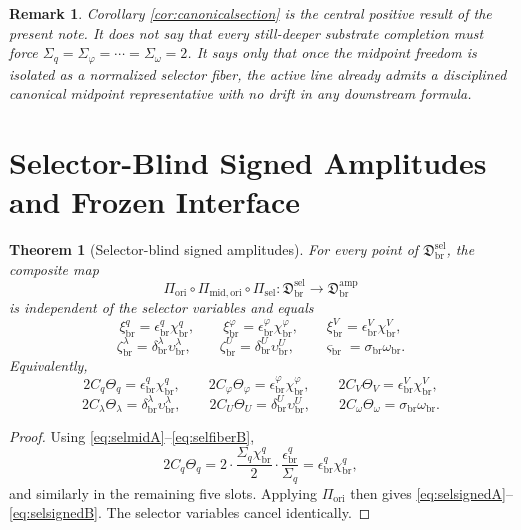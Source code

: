 \documentclass[11pt]{article}
\newcommand{\LiftSector}{\mathfrak D_{\mathrm{br}}^{\mathrm{amp}}}
\newcommand{\DeepReadAmp}{\xi_{\mathrm{br}}^{q}}
\newcommand{\DeepCovAmp}{\xi_{\mathrm{br}}^{\varphi}}
\newcommand{\DeepRelaxAmp}{\xi_{\mathrm{br}}^{V}}
\newcommand{\DeepWellAmp}{\zeta_{\mathrm{br}}^{\lambda}}
\newcommand{\DeepEqAmp}{\zeta_{\mathrm{br}}^{U}}
\newcommand{\DeepScaleAmp}{\varsigma_{\mathrm{br}}}
\newcommand{\AbsReadAmp}{\chi_{\mathrm{br}}^{q}}
\newcommand{\AbsCovAmp}{\chi_{\mathrm{br}}^{\varphi}}
\newcommand{\AbsRelaxAmp}{\chi_{\mathrm{br}}^{V}}
\newcommand{\AbsWellAmp}{\upsilon_{\mathrm{br}}^{\lambda}}
\newcommand{\AbsEqAmp}{\upsilon_{\mathrm{br}}^{U}}
\newcommand{\AbsScaleAmp}{\omega_{\mathrm{br}}}
\newcommand{\PolRead}{\epsilon_{\mathrm{br}}^{q}}
\newcommand{\PolCov}{\epsilon_{\mathrm{br}}^{\varphi}}
\newcommand{\PolRelax}{\epsilon_{\mathrm{br}}^{V}}
\newcommand{\PolWell}{\delta_{\mathrm{br}}^{\lambda}}
\newcommand{\PolEq}{\delta_{\mathrm{br}}^{U}}
\newcommand{\PolScale}{\sigma_{\mathrm{br}}}
\newcommand{\OriginMap}{\Pi_{\mathrm{ori}}}
\newcommand{\MidOriginMap}{\Pi_{\mathrm{mid,ori}}}
\newcommand{\MidRead}{C_{q}}
\newcommand{\MidCov}{C_{\varphi}}
\newcommand{\MidRelax}{C_{V}}
\newcommand{\MidWell}{C_{\lambda}}
\newcommand{\MidEq}{C_{U}}
\newcommand{\MidScale}{C_{\omega}}
\newcommand{\FiberRead}{\Theta_{q}}
\newcommand{\FiberCov}{\Theta_{\varphi}}
\newcommand{\FiberRelax}{\Theta_{V}}
\newcommand{\FiberWell}{\Theta_{\lambda}}
\newcommand{\FiberEq}{\Theta_{U}}
\newcommand{\FiberScale}{\Theta_{\omega}}
\newcommand{\MidSelSector}{\mathfrak D_{\mathrm{br}}^{\mathrm{sel}}}
\newcommand{\MidSelMap}{\Pi_{\mathrm{sel}}}
\newcommand{\SelRead}{\Sigma_{q}}
\newcommand{\SelCov}{\Sigma_{\varphi}}
\newcommand{\SelScale}{\Sigma_{\omega}}
\newtheorem{remark}{Remark}
\newtheorem{theorem}{Theorem}
\begin{document}
\begin{remark}
Corollary \ref{cor:canonicalsection} is the central positive result of the present note. It does not say that every still-deeper substrate completion must force \(\SelRead=\SelCov=\cdots=\SelScale=2\). It says only that once the midpoint freedom is isolated as a normalized selector fiber, the active line already admits a disciplined canonical midpoint representative with no drift in any downstream formula.
\end{remark}

\section{Selector-Blind Signed Amplitudes and Frozen Interface}

\begin{theorem}[Selector-blind signed amplitudes]
\label{thm:signed}
For every point of \(\MidSelSector\), the composite map
\begin{equation}
\OriginMap\circ\MidOriginMap\circ\MidSelMap
:
\MidSelSector
\longrightarrow
\LiftSector
\label{eq:selcomposite}
\end{equation}
is independent of the selector variables and equals
\begin{equation}
\DeepReadAmp=\PolRead\AbsReadAmp,
\qquad
\DeepCovAmp=\PolCov\AbsCovAmp,
\qquad
\DeepRelaxAmp=\PolRelax\AbsRelaxAmp,
\label{eq:selsignedA}
\end{equation}
\begin{equation}
\DeepWellAmp=\PolWell\AbsWellAmp,
\qquad
\DeepEqAmp=\PolEq\AbsEqAmp,
\qquad
\DeepScaleAmp=\PolScale\AbsScaleAmp.
\label{eq:selsignedB}
\end{equation}
Equivalently,
\begin{equation}
2\MidRead\FiberRead=\PolRead\AbsReadAmp,
\qquad
2\MidCov\FiberCov=\PolCov\AbsCovAmp,
\qquad
2\MidRelax\FiberRelax=\PolRelax\AbsRelaxAmp,
\label{eq:selproductA}
\end{equation}
\begin{equation}
2\MidWell\FiberWell=\PolWell\AbsWellAmp,
\qquad
2\MidEq\FiberEq=\PolEq\AbsEqAmp,
\qquad
2\MidScale\FiberScale=\PolScale\AbsScaleAmp.
\label{eq:selproductB}
\end{equation}
\end{theorem}

\begin{proof}
Using \eqref{eq:selmidA}--\eqref{eq:selfiberB},
\[
2\MidRead\FiberRead
=
2\cdot\frac{\SelRead\AbsReadAmp}{2}\cdot\frac{\PolRead}{\SelRead}
=
\PolRead\AbsReadAmp,
\]
and similarly in the remaining five slots. Applying \(\OriginMap\) then gives \eqref{eq:selsignedA}--\eqref{eq:selsignedB}. The selector variables cancel identically.
\end{proof}
\end{document}
